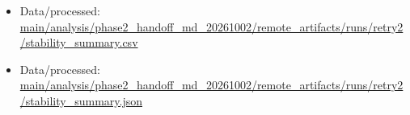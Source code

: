 \begin{itemize}[leftmargin=1.4em,noitemsep]
\item Data/processed: \begingroup\scriptsize\url{main/analysis/phase2_handoff_md_20261002/remote_artifacts/runs/retry2/stability_summary.csv}\endgroup
\item Data/processed: \begingroup\scriptsize\url{main/analysis/phase2_handoff_md_20261002/remote_artifacts/runs/retry2/stability_summary.json}\endgroup
\end{itemize}

